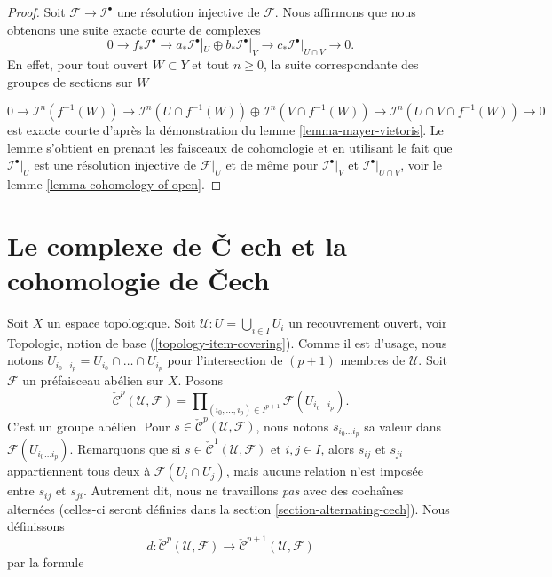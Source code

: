\begin{proof}

Soit $\mathcal{F} \to \mathcal{I}^\bullet$ une résolution injective de $\mathcal{F}$. Nous affirmons que nous obtenons une suite exacte courte de complexes
$$
0 \to
f_*\mathcal{I}^\bullet \to
a_*\mathcal{I}^\bullet|_U \oplus b_*\mathcal{I}^\bullet|_V \to
c_*\mathcal{I}^\bullet|_{U \cap V} \to
0.
$$
En effet, pour tout ouvert $W \subset Y$ et tout $n \geq 0$, la suite correspondante des groupes de sections sur $W$

$$
0 \to
\mathcal{I}^n(f^{-1}(W)) \to
\mathcal{I}^n(U \cap f^{-1}(W))
\oplus \mathcal{I}^n(V \cap f^{-1}(W)) \to
\mathcal{I}^n(U \cap V \cap f^{-1}(W)) \to
0
$$
est exacte courte d'après la démonstration du lemme \ref{lemma-mayer-vietoris}. Le lemme s'obtient en prenant les faisceaux de cohomologie et en utilisant le fait que
$\mathcal{I}^\bullet|_U$ est une résolution injective de $\mathcal{F}|_U$
et de même pour $\mathcal{I}^\bullet|_V$ et $\mathcal{I}^\bullet|_{U \cap V}$,
voir le lemme \ref{lemma-cohomology-of-open}.

\end{proof}



















\section{Le complexe de {\v C}
ech et la cohomologie de {\v C}ech}
\label{section-cech}

\noindent

Soit $X$ un espace topologique. Soit $\mathcal{U} : U = \bigcup_{i \in I} U_i$ un recouvrement ouvert, voir Topologie, notion de base (\ref{topology-item-covering}). Comme il est d'usage, nous notons
$U_{i_0\ldots i_p} = U_{i_0} \cap \ldots \cap U_{i_p}$ pour
l'intersection de $(p + 1)$ membres de $\mathcal{U}$. Soit $\mathcal{F}$ un préfaisceau abélien sur $X$. Posons
$$
\check{\mathcal{C}}^p(\mathcal{U}, \mathcal{F})
=
\prod\nolimits_{(i_0, \ldots, i_p) \in I^{p + 1}}
\mathcal{F}(U_{i_0\ldots i_p}).
$$
C'est un groupe abélien. Pour
$s \in \check{\mathcal{C}}^p(\mathcal{U}, \mathcal{F})$, nous notons
$s_{i_0\ldots i_p}$ sa valeur dans $\mathcal{F}(U_{i_0\ldots i_p})$. Remarquons que si $s \in \check{\mathcal{C}}^1(\mathcal{U}, \mathcal{F})$
et $i, j \in I$, alors $s_{ij}$ et $s_{ji}$ appartiennent tous deux à $\mathcal{F}(U_i \cap U_j)$, mais aucune relation n'est imposée entre $s_{ij}$ et $s_{ji}$. Autrement dit, nous ne travaillons {\it pas}
avec des cochaînes alternées (celles-ci seront définies dans la section \ref{section-alternating-cech}). Nous définissons
$$
d : \check{\mathcal{C}}^p(\mathcal{U}, \mathcal{F})
\longrightarrow
\check{\mathcal{C}}^{p + 1}(\mathcal{U}, \mathcal{F})
$$
par la formule

